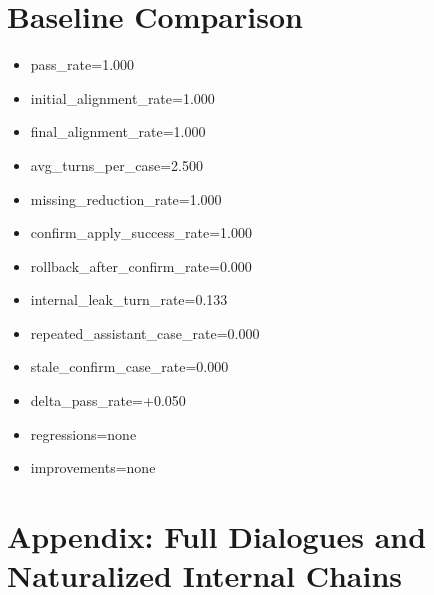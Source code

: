 \documentclass[11pt]{ctexart}
\begin{document}
\section{Baseline Comparison}
\begin{itemize}
\item pass\_rate=1.000
\item initial\_alignment\_rate=1.000
\item final\_alignment\_rate=1.000
\item avg\_turns\_per\_case=2.500
\item missing\_reduction\_rate=1.000
\item confirm\_apply\_success\_rate=1.000
\item rollback\_after\_confirm\_rate=0.000
\item internal\_leak\_turn\_rate=0.133
\item repeated\_assistant\_case\_rate=0.000
\item stale\_confirm\_case\_rate=0.000
\item delta\_pass\_rate=+0.050
\item regressions=none
\item improvements=none
\end{itemize}
\appendix
\section{Appendix: Full Dialogues and Naturalized Internal Chains}
\end{document}
